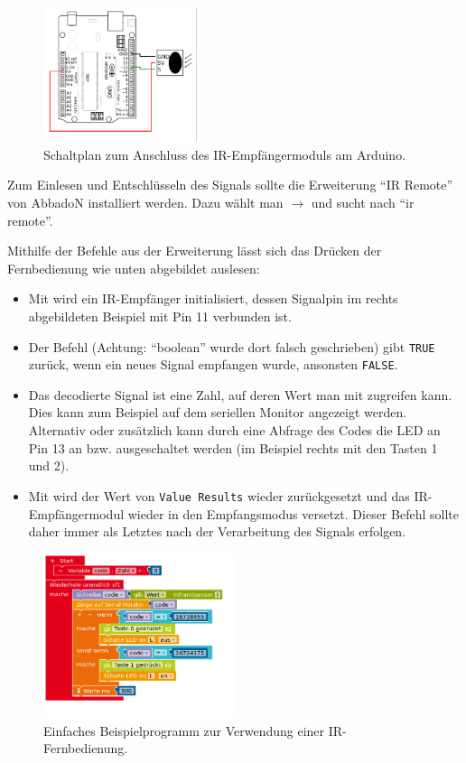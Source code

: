 \begin{figure}[H]
	\centering
	\includegraphics[width=0.4\textwidth]{./Zeichnungen/Schaltplan-IR-Empfaenger.png}
	\caption{Schaltplan zum Anschluss des IR-Empfängermoduls am Arduino.}
\end{figure}

Zum Einlesen und Entschlüsseln des Signals sollte die Erweiterung \enquote{IR Remote} von AbbadoN installiert werden. Dazu wählt man  $\rightarrow$  und sucht nach \enquote{ir remote}.

Mithilfe der Befehle aus der Erweiterung lässt sich das Drücken der Fernbedienung wie unten abgebildet auslesen:
\begin{itemize}[itemsep=0mm,parsep=0mm]
	\item Mit  wird ein IR-Empfänger initialisiert, dessen Signalpin im rechts abgebildeten Beispiel mit Pin 11 verbunden ist.
	\item Der Befehl  (Achtung: \enquote{boolean} wurde dort falsch geschrieben) gibt \texttt{TRUE} zurück, wenn ein neues Signal empfangen wurde, ansonsten \texttt{FALSE}.
	\item Das decodierte Signal ist eine Zahl, auf deren Wert man mit  zugreifen kann. Dies kann zum Beispiel auf dem seriellen Monitor angezeigt werden. Alternativ oder zusätzlich kann durch eine Abfrage des Codes die LED an Pin 13 an bzw. ausgeschaltet werden (im Beispiel rechts mit den Tasten 1 und 2).
	\item Mit  wird der Wert von \texttt{Value Results} wieder zurückgesetzt und das IR-Empfängermodul wieder in den Empfangsmodus versetzt. Dieser Befehl sollte daher immer als Letztes nach der Verarbeitung des Signals erfolgen.
\end{itemize}

\begin{figure}[H]
	\centering
	\includegraphics[width=0.5\textwidth]{./pics/ir-fernbedienung-auslesen.png}
	\caption{Einfaches Beispielprogramm zur Verwendung einer IR-Fernbedienung.}
\end{figure}

